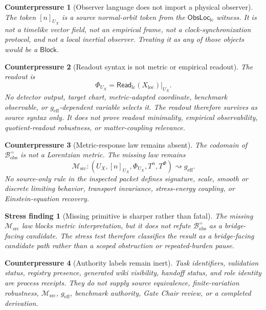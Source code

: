 \documentclass[11pt]{article}
\newcommand{\ReadLC}{\mathsf{Read}_{\mathrm{lc}}}
\newcommand{\ObsLocLC}{\mathsf{ObsLoc}_{\mathrm{lc}}}
\newcommand{\Bobs}{\mathcal{B}^{=}_{\mathrm{obs}}}
\newcommand{\Msrc}{\mathcal{M}_{\mathrm{src}}}
\newcommand{\geff}{g_{\mathrm{eff}}}
\newcommand{\Block}{\mathsf{Block}}
\newtheorem{counterpressure}{Counterpressure}
\newtheorem{stressfinding}{Stress finding}
\begin{document}
\begin{counterpressure}[Observer language does not import a physical observer]
The token \([n]_{U_X}\) is a source normal-orbit token from the
\(\ObsLocLC\) witness. It is not a timelike vector field, not an
empirical frame, not a clock-synchronization protocol, and not a local
inertial observer. Treating it as any of those objects would be a
\(\Block\).
\end{counterpressure}

\begin{counterpressure}[Readout syntax is not metric or empirical readout]
The readout is
\[
    \Phi_{U_X}=\ReadLC(X_{\mathrm{loc}})|_{U_X}.
\]
No detector output, target chart, metric-adapted coordinate, benchmark
observable, or \(\geff\)-dependent variable selects it. The readout
therefore survives as source syntax only. It does not prove readout
minimality, empirical observability, quotient-readout robustness, or
matter-coupling relevance.
\end{counterpressure}

\begin{counterpressure}[Metric-response law remains absent]
The codomain of \(\Bobs\) is not a Lorentzian metric. The missing law
remains
\[
    \Msrc:
    (U_X,[n]_{U_X},\Phi_{U_X},T^n,T^\Phi)
    \rightsquigarrow
    \geff.
\]
No source-only rule in the inspected packet defines signature, scale,
smooth or discrete limiting behavior, transport invariance,
stress-energy coupling, or Einstein-equation recovery.
\end{counterpressure}

\begin{stressfinding}[Missing primitive is sharper rather than fatal]
The missing \(\Msrc\) law blocks metric interpretation, but it does
not refute \(\Bobs\) as a bridge-facing candidate. The stress test
therefore classifies the result as a bridge-facing candidate path
rather than a scoped obstruction or repeated-burden pause.
\end{stressfinding}

\begin{counterpressure}[Authority labels remain inert]
Task identifiers, validation status, registry presence, generated wiki
visibility, handoff status, and role identity are process receipts.
They do not supply source equivalence, finite-variation robustness,
\(\Msrc\), \(\geff\), benchmark authority, Gate Chair review, or a
completed derivation.
\end{counterpressure}
\end{document}
